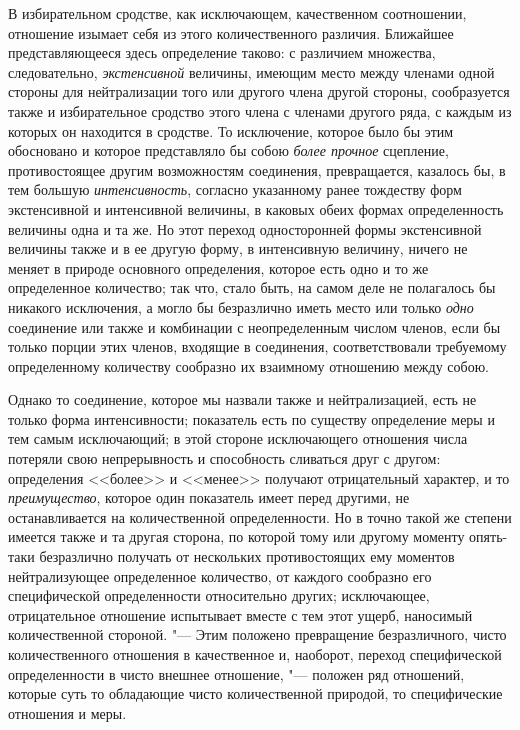 В избирательном сродстве, как исключающем, качественном соотношении,
отношение изымает себя из этого количественного различия. Ближайшее
представляющееся здесь определение таково: с различием множества,
следовательно, {\em экстенсивной} величины, имеющим
место между членами одной стороны для нейтрализации того или другого члена
другой стороны, сообразуется также и избирательное сродство этого члена с
членами другого ряда, с каждым из которых он находится в сродстве. То
исключение, которое было бы этим обосновано и которое представляло бы собою
{\em более прочное} сцепление, противостоящее другим
возможностям соединения, превращается, казалось бы, в тем большую
{\em интенсивность}, согласно указанному ранее
тождеству форм экстенсивной и интенсивной величины, в каковых обеих формах
определенность величины одна и та же. Но этот переход односторонней формы
экстенсивной величины также и в ее другую форму, в интенсивную величину,
ничего не меняет в природе основного определения, которое есть одно и то же
определенное количество; так что, стало быть, на самом деле не полагалось
бы никакого исключения, а могло бы безразлично иметь место или только
{\em одно} соединение или также и комбинации с
неопределенным числом членов, если бы только порции этих членов, входящие в
соединения, соответствовали требуемому определенному количеству сообразно
их взаимному отношению между собою.

Однако то соединение, которое мы назвали также и нейтрализацией, есть не
только форма интенсивности; показатель есть по существу определение меры и
тем самым исключающий; в этой стороне исключающего отношения числа потеряли
свою непрерывность и способность сливаться друг с другом: определения
<<более>> и <<менее>> получают отрицательный характер, и то
{\em преимущество}, которое один показатель имеет перед
другими, не останавливается на количественной определенности. Но в точно
такой же степени имеется также и та другая сторона, по которой тому или
другому моменту опять-таки безразлично получать от нескольких
противостоящих ему моментов нейтрализующее определенное количество, от
каждого сообразно его специфической определенности относительно других;
исключающее, отрицательное отношение испытывает вместе с тем этот ущерб,
наносимый количественной стороной. "--- Этим положено превращение
безразличного, чисто количественного отношения в качественное и, наоборот,
переход специфической определенности в чисто внешнее отношение, "--- положен
ряд отношений, которые суть то обладающие чисто количественной природой, то
специфические отношения и меры.


